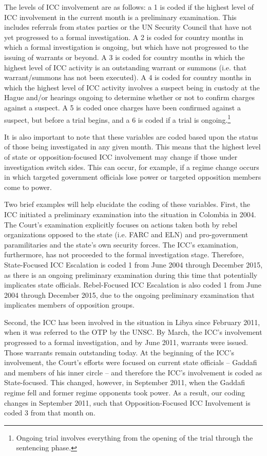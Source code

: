 The levels of ICC involvement are as follows: a 1 is coded if the highest level of ICC involvement in the current month is a preliminary examination.  This includes referrals from states parties or the UN Security Council that have not yet progressed to a formal investigation.  A 2 is coded for country months in which a formal investigation is ongoing, but which have not progressed to the issuing of warrants or beyond.  A 3 is coded for country months in which the highest level of ICC activity is an outstanding warrant or summons (i.e. that warrant/summons has not been executed).  A 4 is coded for country months in which the highest level of ICC activity involves a suspect being in custody at the Hague and/or hearings ongoing to determine whether or not to confirm charges against a suspect. A 5 is coded once charges have been confirmed against a suspect, but before a trial begins, and a 6 is coded if a trial is ongoing.\footnote{Ongoing trial involves everything from the opening of the trial through the sentencing phase.} 

It is also important to note that these variables are coded based upon the status of those being investigated in any given month.  This means that the highest level of state or opposition-focused ICC involvement may change if those under investigation switch sides.  This can occur, for example, if a regime change occurs in which targeted government officials lose power or targeted opposition members come to power.   

Two brief examples will help elucidate the coding of these variables.  First, the ICC initiated a preliminary examination into the situation in Colombia in 2004.  The Court’s examination explicitly focuses on actions taken both by rebel organizations opposed to the state (i.e. FARC and ELN) and pro-government paramilitaries and the state’s own security forces.  The ICC’s examination, furthermore, has not proceeded to the formal investigation stage.  Therefore, State-Focused ICC Escalation is coded 1 from June 2004 through December 2015, as there is an ongoing preliminary examination during this time that potentially implicates state officials.  Rebel-Focused ICC Escalation is also coded 1 from June 2004 through December 2015, due to the ongoing preliminary examination that implicates members of opposition groups. 

Second, the ICC has been involved in the situation in Libya since February 2011, when it was referred to the OTP by the UNSC.  By March, the ICC’s involvement progressed to a formal investigation, and by June 2011, warrants were issued.  Those warrants remain outstanding today.  At the beginning of the ICC’s involvement, the Court’s efforts were focused on current state officials -- Gaddafi and members of his inner circle – and therefore the ICC’s involvement is coded as State-focused.  This changed, however, in September 2011, when the Gaddafi regime fell and former regime opponents took power.  As a result, our coding changes in September 2011, such that Opposition-Focused ICC Involvement is coded 3 from that month on.  

